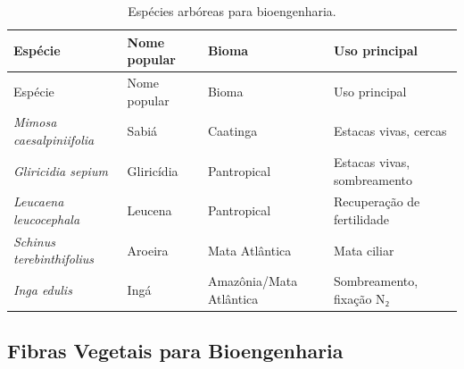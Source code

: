 \documentclass[
  portuguese,
  11pt,
  a4paper,
  open=any]{scrbook}
\begin{document}
\begin{longtable}[]{@{}
  >{\raggedright\arraybackslash}p{}
  >{\raggedright\arraybackslash}p{}
  >{\raggedright\arraybackslash}p{}
  >{\raggedright\arraybackslash}p{}@{}}
\caption{Espécies arbóreas para
bioengenharia.}\label{tbl-arboreas}\tabularnewline
\toprule\noalign{}
\begin{minipage}[b]{\linewidth}\raggedright
Espécie
\end{minipage} & \begin{minipage}[b]{\linewidth}\raggedright
Nome popular
\end{minipage} & \begin{minipage}[b]{\linewidth}\raggedright
Bioma
\end{minipage} & \begin{minipage}[b]{\linewidth}\raggedright
Uso principal
\end{minipage} \\
\midrule\noalign{}
\endfirsthead
\toprule\noalign{}
\begin{minipage}[b]{\linewidth}\raggedright
Espécie
\end{minipage} & \begin{minipage}[b]{\linewidth}\raggedright
Nome popular
\end{minipage} & \begin{minipage}[b]{\linewidth}\raggedright
Bioma
\end{minipage} & \begin{minipage}[b]{\linewidth}\raggedright
Uso principal
\end{minipage} \\
\midrule\noalign{}
\endhead
\bottomrule\noalign{}
\endlastfoot
\emph{Mimosa caesalpiniifolia} & Sabiá & Caatinga & Estacas vivas,
cercas \\
\emph{Gliricidia sepium} & Gliricídia & Pantropical & Estacas vivas,
sombreamento \\
\emph{Leucaena leucocephala} & Leucena & Pantropical & Recuperação de
fertilidade \\
\emph{Schinus terebinthifolius} & Aroeira & Mata Atlântica & Mata
ciliar \\
\emph{Inga edulis} & Ingá & Amazônia/Mata Atlântica & Sombreamento,
fixação N₂ \\
\end{longtable}

\subsection{Fibras Vegetais para
Bioengenharia}\label{fibras-vegetais-para-bioengenharia}
\end{document}

